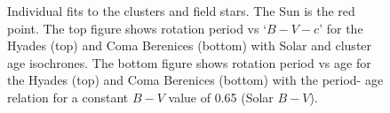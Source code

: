 \begin{figure}
\begin{center}
    \end{center}
    \caption[Fits to age-rotation curves for individual clusters]
{ Individual fits to the clusters and field stars. The Sun is the
	    red point. The top figure shows rotation period vs `$B-V-c$' for
	    the Hyades (top) and Coma Berenices (bottom) with Solar and cluster
	    age isochrones. The bottom figure shows rotation period vs age
	    for the Hyades (top) and Coma Berenices (bottom) with the period-
	    age relation for a constant $B-V$ value of 0.65 (Solar $B-V$).
\label{fig:subfigures1}}
\end{figure}

